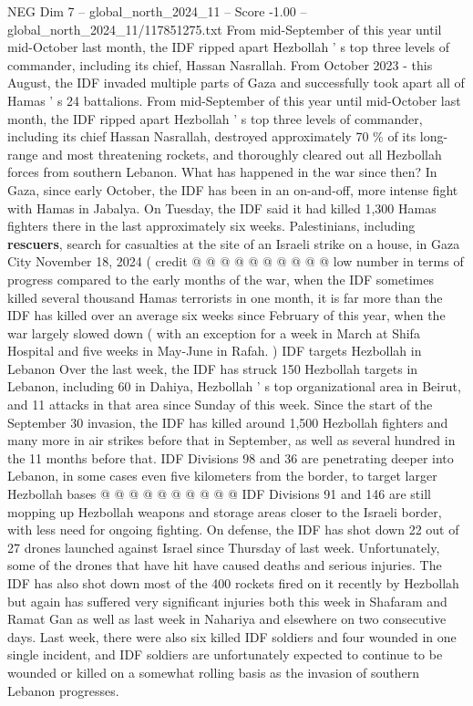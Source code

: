 \begin{textsample}{NEG Dim 7 – global\_north\_2024\_11 – Score -1.00 – global\_north\_2024\_11/117851275.txt}  \label{ex:f7_neg_342}
From mid-September of this year until mid-October last month, the IDF ripped apart Hezbollah ' s top three levels of commander, including its chief, Hassan Nasrallah.
From October 2023 - this August, the IDF invaded multiple parts of Gaza and successfully took apart all of Hamas ' s 24 battalions.
From mid-September of this year until mid-October last month, the IDF ripped apart Hezbollah ' s top three levels of commander, including its chief Hassan Nasrallah, destroyed approximately 70 \% of its long-range and most threatening rockets, and thoroughly cleared out all Hezbollah forces from southern Lebanon.
What has happened in the war since then?
In Gaza, since early October, the IDF has been in an on-and-off, more intense fight with Hamas in Jabalya.
On Tuesday, the IDF said it had killed 1,300 Hamas fighters there in the last approximately six weeks.
Palestinians, including \textbf{rescuers}, search for casualties at the site of an Israeli strike on a house, in Gaza City November 18, 2024 ( credit @ @ @ @ @ @ @ @ @ @ low number in terms of progress compared to the early months of the war, when the IDF sometimes killed several thousand Hamas terrorists in one month, it is far more than the IDF has killed over an average six weeks since February of this year, when the war largely slowed down ( with an exception for a week in March at Shifa Hospital and five weeks in May-June in Rafah. ) IDF targets Hezbollah in Lebanon Over the last week, the IDF has struck 150 Hezbollah targets in Lebanon, including 60 in Dahiya, Hezbollah ' s top organizational area in Beirut, and 11 attacks in that area since Sunday of this week.
Since the start of the September 30 invasion, the IDF has killed around 1,500 Hezbollah fighters and many more in air strikes before that in September, as well as several hundred in the 11 months before that.
IDF Divisions 98 and 36 are penetrating deeper into Lebanon, in some cases even five kilometers from the border, to target larger Hezbollah bases @ @ @ @ @ @ @ @ @ @ IDF Divisions 91 and 146 are still mopping up Hezbollah weapons and storage areas closer to the Israeli border, with less need for ongoing fighting.
On defense, the IDF has shot down 22 out of 27 drones launched against Israel since Thursday of last week.
Unfortunately, some of the drones that have hit have caused deaths and serious injuries.
The IDF has also shot down most of the 400 rockets fired on it recently by Hezbollah but again has suffered very significant injuries both this week in Shafaram and Ramat Gan as well as last week in Nahariya and elsewhere on two consecutive days.
Last week, there were also six killed IDF soldiers and four wounded in one single incident, and IDF soldiers are unfortunately expected to continue to be wounded or killed on a somewhat rolling basis as the invasion of southern Lebanon progresses.

\end{textsample}
